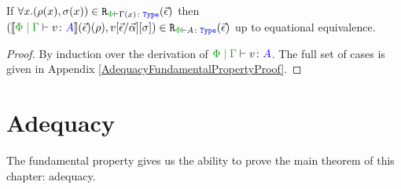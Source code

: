 \begin{framed}
    \begin{theorem}\label{FundPropTheorem}
        If $\forall x. \inLogRelPE{\rho(x)}{\si(x)}{\G(x)}$ then $\inLogRelPE{\deno{\gpetyperelation{v}{A}}\fundRho}{v\fundSub}{A}$ up to equational equivalence.    
    \end{theorem}
    
    \begin{proof}
        By induction over the derivation of $\gpetyperelation{v}{A}$. The full set of  cases is given in Appendix \ref{AdequacyFundamentalPropertyProof}.
    \end{proof}
\end{framed}


\section{Adequacy}
\label{AdequacySection}

The fundamental property gives us the ability to prove the main theorem of this chapter: adequacy.

